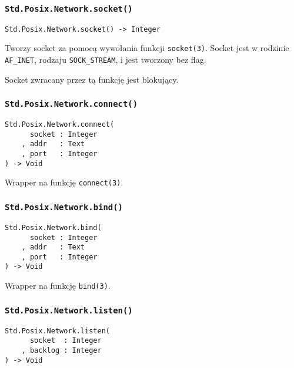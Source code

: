 \subsubsection{\texttt{Std.Posix.Network.socket()}}

\begin{small}
\begin{lstlisting}
Std.Posix.Network.socket() -> Integer
\end{lstlisting}
\end{small}

Tworzy socket za pomocą wywołania funkcji \texttt{socket(3)}.
Socket jest w rodzinie \texttt{AF\_INET}, rodzaju \texttt{SOCK\_STREAM}, i jest tworzony bez flag.

Socket zwracany przez tą funkcję jest blokujący.

\subsubsection{\texttt{Std.Posix.Network.connect()}}

\begin{small}
\begin{lstlisting}
Std.Posix.Network.connect(
      socket : Integer
    , addr   : Text
    , port   : Integer
) -> Void
\end{lstlisting}
\end{small}

Wrapper na funkcję \texttt{connect(3)}.

\subsubsection{\texttt{Std.Posix.Network.bind()}}

\begin{small}
\begin{lstlisting}
Std.Posix.Network.bind(
      socket : Integer
    , addr   : Text
    , port   : Integer
) -> Void
\end{lstlisting}
\end{small}

Wrapper na funkcję \texttt{bind(3)}.

\subsubsection{\texttt{Std.Posix.Network.listen()}}

\begin{small}
\begin{lstlisting}
Std.Posix.Network.listen(
      socket  : Integer
    , backlog : Integer
) -> Void
\end{lstlisting}
\end{small}

